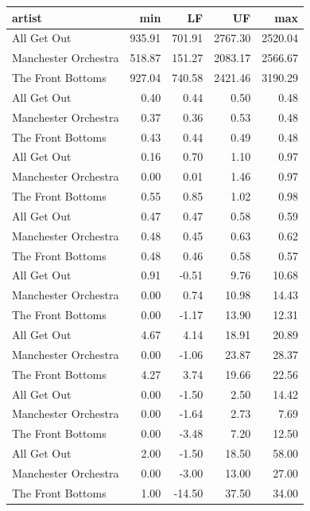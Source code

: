 \documentclass{article}\usepackage[]{graphicx}\usepackage[]{xcolor}
\begin{document}
\begin{multicols}{2}
\begin{table}[ht]
\centering
\begin{tabular}{lrrrr}
  \hline
artist & min & LF & UF & max \\ 
  \hline
All Get Out & 935.91 & 701.91 & 2767.30 & 2520.04 \\ 
  Manchester Orchestra & 518.87 & 151.27 & 2083.17 & 2566.67 \\ 
  The Front Bottoms & 927.04 & 740.58 & 2421.46 & 3190.29 \\ 
  All Get Out & 0.40 & 0.44 & 0.50 & 0.48 \\ 
  Manchester Orchestra & 0.37 & 0.36 & 0.53 & 0.48 \\ 
  The Front Bottoms & 0.43 & 0.44 & 0.49 & 0.48 \\ 
  All Get Out & 0.16 & 0.70 & 1.10 & 0.97 \\ 
  Manchester Orchestra & 0.00 & 0.01 & 1.46 & 0.97 \\ 
  The Front Bottoms & 0.55 & 0.85 & 1.02 & 0.98 \\ 
  All Get Out & 0.47 & 0.47 & 0.58 & 0.59 \\ 
  Manchester Orchestra & 0.48 & 0.45 & 0.63 & 0.62 \\ 
  The Front Bottoms & 0.48 & 0.46 & 0.58 & 0.57 \\ 
  All Get Out & 0.91 & -0.51 & 9.76 & 10.68 \\ 
  Manchester Orchestra & 0.00 & 0.74 & 10.98 & 14.43 \\ 
  The Front Bottoms & 0.00 & -1.17 & 13.90 & 12.31 \\ 
  All Get Out & 4.67 & 4.14 & 18.91 & 20.89 \\ 
  Manchester Orchestra & 0.00 & -1.06 & 23.87 & 28.37 \\ 
  The Front Bottoms & 4.27 & 3.74 & 19.66 & 22.56 \\ 
  All Get Out & 0.00 & -1.50 & 2.50 & 14.42 \\ 
  Manchester Orchestra & 0.00 & -1.64 & 2.73 & 7.69 \\ 
  The Front Bottoms & 0.00 & -3.48 & 7.20 & 12.50 \\ 
  All Get Out & 2.00 & -1.50 & 18.50 & 58.00 \\ 
  Manchester Orchestra & 0.00 & -3.00 & 13.00 & 27.00 \\ 
  The Front Bottoms & 1.00 & -14.50 & 37.50 & 34.00 \\ 
   \hline
\end{tabular}
\end{table}



\end{multicols}
\end{document}
